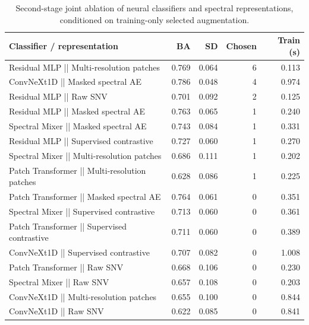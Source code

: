 \begin{table}[t]
\centering
\caption{Second-stage joint ablation of neural classifiers and spectral representations, conditioned on training-only selected augmentation.}
\label{tab:joint_second}
\footnotesize
\setlength{\tabcolsep}{4pt}
\begin{tabular}{lrrrr}
\toprule
Classifier / representation & BA & SD & Chosen & Train (s) \\
\midrule
Residual MLP || Multi-resolution patches & 0.769 & 0.064 & 6 & 0.113 \\
ConvNeXt1D || Masked spectral AE & 0.786 & 0.048 & 4 & 0.974 \\
Residual MLP || Raw SNV & 0.701 & 0.092 & 2 & 0.125 \\
Residual MLP || Masked spectral AE & 0.763 & 0.065 & 1 & 0.240 \\
Spectral Mixer || Masked spectral AE & 0.743 & 0.084 & 1 & 0.331 \\
Residual MLP || Supervised contrastive & 0.727 & 0.060 & 1 & 0.270 \\
Spectral Mixer || Multi-resolution patches & 0.686 & 0.111 & 1 & 0.202 \\
Patch Transformer || Multi-resolution patches & 0.628 & 0.086 & 1 & 0.225 \\
Patch Transformer || Masked spectral AE & 0.764 & 0.061 & 0 & 0.351 \\
Spectral Mixer || Supervised contrastive & 0.713 & 0.060 & 0 & 0.361 \\
Patch Transformer || Supervised contrastive & 0.711 & 0.060 & 0 & 0.389 \\
ConvNeXt1D || Supervised contrastive & 0.707 & 0.082 & 0 & 1.008 \\
Patch Transformer || Raw SNV & 0.668 & 0.106 & 0 & 0.230 \\
Spectral Mixer || Raw SNV & 0.657 & 0.108 & 0 & 0.203 \\
ConvNeXt1D || Multi-resolution patches & 0.655 & 0.100 & 0 & 0.844 \\
ConvNeXt1D || Raw SNV & 0.622 & 0.085 & 0 & 0.841 \\
\bottomrule
\end{tabular}
\end{table}
